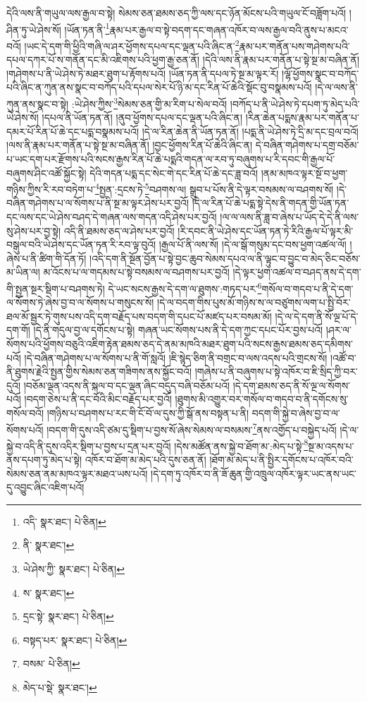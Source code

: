 དེའི་ལས་ནི་གཡུལ་ལས་རྒྱལ་བ་སྟེ། སེམས་ཅན་ཐམས་ཅད་ཀྱི་ལས་དང་ཉོན་མོངས་པའི་གཡུལ་ངོ་བཟློག་པའོ། །ཤིན་ཏུ་ཡེ་ཤེས་སོ། །ཡོན་ཏན་ནི་\footnote{འདི་  སྣར་ཐང་།  པེ་ཅིན། }རྣམ་པར་རྒྱལ་བ་སྟེ་བདག་དང་གཞན་འཁོར་བ་ལས་རྒྱལ་བའི་ནུས་པ་མངའ་བའོ། །ཡང་དེ་དག་གི་ཕྱིའི་གཞི་ལ་ཤར་ཕྱོགས་དཔལ་དང་ལྡན་པའི་ཞིང་ན་\footnote{ནི་  སྣར་ཐང་། }རྣམ་པར་གནོན་པས་གཤེགས་པའི་དཔལ་དཀར་པོ་ས་གནོན་དང་མི་འཇིགས་པའི་ཕྱག་རྒྱ་ཅན་ནོ། །དེའི་ལས་ནི་རྣམ་པར་གནོན་པ་སྟེ་སྔ་མ་བཞིན་ནོ། །གཤེགས་པ་ནི་ཡེ་ཤེས་ཏེ་མཐར་ཐུག་པ་རྟོགས་པའོ། །ཡོན་ཏན་ནི་དཔལ་ཏེ་སྔ་མ་ལྟར་རོ། །ལྷོ་ཕྱོགས་སྣང་བ་བཀོད་པའི་ཞིང་ན་ཀུན་ནས་སྣང་བ་བཀོད་པའི་དཔལ་སེར་པོ་ཉི་མ་དང་རིན་པོ་ཆེའི་སྡོང་བུ་བསྣམས་པའོ། །དེ་ལ་ལས་ནི་ཀུན་ནས་སྣང་བ་སྟེ། :ཡེ་ཤེས་ཀྱིས་\footnote{ཡེ་ཤེས་ཀྱི་  སྣར་ཐང་།  པེ་ཅིན། }སེམས་ཅན་གྱི་མ་རིག་པ་སེལ་བའོ། །བཀོད་པ་ནི་ཡེ་ཤེས་ཏེ་དཔག་ཏུ་མེད་པའི་ཡེ་ཤེས་སོ། །དཔལ་ནི་ཡོན་ཏན་ནོ། །ནུབ་ཕྱོགས་དཔལ་དང་ལྡན་པའི་ཞིང་ན། །རིན་ཆེན་པདྨས་རྣམ་པར་གནོན་པ་དམར་པོ་རིན་པོ་ཆེ་དང་པདྨ་བསྣམས་པའོ། །དེ་ལ་རིན་ཆེན་ནི་ཡོན་ཏན་ནོ། །པདྨ་ནི་ཡེ་ཤེས་ཏེ་དྲི་མ་དང་བྲལ་བའོ། །ལས་ནི་རྣམ་པར་གནོན་པ་སྟེ་སྔ་མ་བཞིན་ནོ། །བྱང་ཕྱོགས་རིན་པོ་ཆེའི་ཞིང་ན། དེ་བཞིན་གཤེགས་པ་དགྲ་བཅོམ་པ་ཡང་དག་པར་རྫོགས་པའི་སངས་རྒྱས་རིན་པོ་ཆེ་པདྨའི་གདན་ལ་རབ་ཏུ་བཞུགས་པ་རི་དབང་གི་རྒྱལ་པོ་བཞུགས་ཤིང་འཚོ་སྐྱོང་སྟེ། དེའི་གདན་པདྨ་དང་སེང་གེ་དང་རིན་པོ་ཆེ་དང་ཟླ་བའོ། །ནམ་མཁའ་ལྟར་སྔོ་བ་ཕྱག་གཉིས་ཀྱིས་རི་རབ་བཏེག་པ་\footnote{ས་  སྣར་ཐང་། }སྤྱན་:དྲངས་ཏེ་\footnote{དྲང་སྟེ་  སྣར་ཐང་།  པེ་ཅིན། }བཤགས་ལ། སྒྲུབ་པ་པོས་ནི་དེ་ལྟར་བསམས་ལ་བཤགས་སོ། །དེ་བཞིན་གཤེགས་པ་ལ་སོགས་པ་ནི་སྔ་མ་ལྟར་ཤེས་པར་བྱའོ། །དེ་ལ་རིན་པོ་ཆེ་པདྨ་སྟེ་དེས་ནི་གདན་གྱི་ཡོན་ཏན་དང་ལས་དང་ཡེ་ཤེས་བཤད་དེ་གཞན་ལས་གདན་འདི་ཤེས་པར་བྱའོ། །ལ་ལ་ལས་ནི་ཟླ་བ་ཞེས་པ་ཡོད་དེ་དེ་ནི་ལས་སུ་ཤེས་པར་བྱ་སྟེ། འདི་ནི་ཐམས་ཅད་ལ་ཤེས་པར་བྱའོ། །རི་དབང་ནི་ཡེ་ཤེས་དང་ཡོན་ཏན་ཏེ་རིའི་རྒྱལ་པོ་ལྟར་མི་བསྒུལ་བའི་ཡེ་ཤེས་དང་ཡོན་ཏན་རི་རབ་ལྟ་བུའོ། །རྒྱལ་པོ་ནི་ལས་སོ། །དེ་ལ་སྒོ་གསུམ་དང་བས་ཕྱག་འཚལ་ལོ། །ཞེས་པ་ནི་ཚིག་གི་དོན་ཏོ། །འདི་དག་ནི་སྔོན་བྱོན་པ་སྟེ་བྱང་ཆུབ་སེམས་དཔའ་ལ་ནི་ལྟུང་བ་བྱུང་བ་མེད་ཅིང་བཅོས་མ་ཡིན་ལ། མ་འོངས་པ་ལ་གདམས་པ་སྟེ་བསམས་ལ་བཤགས་པར་བྱའོ། །དེ་ལྟར་ཕྱག་འཚལ་བ་བཤད་ནས་དེ་དག་གི་སྤྱན་སྔར་སྡིག་པ་བཤགས་ཏེ། དེ་ཡང་སངས་རྒྱས་དེ་དག་ལ་ཐུགས་:གཏད་པར་\footnote{བསྟད་པར་  སྣར་ཐང་།  པེ་ཅིན། }གསོལ་བ་གདབ་པ་ནི་དེ་དག་ལ་སོགས་ཏེ་ཞེས་བྱ་བ་ལ་སོགས་པ་གསུངས་སོ། །དེ་ལ་བདག་གིས་པུས་མོ་གཉིས་ས་ལ་བཙུགས་ལག་པ་སྤྱི་བོར་ཐལ་མོ་སྦྱར་ཏེ་གུས་པས་འདི་དག་བརྗོད་པས་བདག་གི་དཔང་པོ་མཛད་པར་བསམ་མོ། །དེ་ལ་དེ་དག་ནི་སོ་ལྔ་པོ་དེ་དག་གོ། །དེ་ནི་གདུལ་བྱ་ལ་དགོངས་པ་སྟེ། གཞན་ཡང་སོགས་པས་ནི་དེ་དག་ཀྱང་དཔང་པོར་བྱས་པའོ། །ཤར་ལ་སོགས་པའི་ཕྱོགས་བཅུའི་འཇིག་རྟེན་ཐམས་ཅད་དེ་ནམ་མཁའི་མཐར་ཐུག་པའི་སངས་རྒྱས་ཐམས་ཅད་དམིགས་པའོ། །དེ་བཞིན་གཤེགས་པ་ལ་སོགས་པ་ནི་གོ་སླའོ། །ཇི་སྙེད་ཅིག་ནི་བགྲང་བ་ལས་འདས་པའི་གྲངས་སོ། །འཚོ་བ་ནི་ཐུགས་རྗེའི་སྤྱན་གྱིས་སེམས་ཅན་གཟིགས་ནས་སྐྱོང་བའོ། །གཞེས་པ་ནི་བཞུགས་པ་སྟེ་འཁོར་བ་ཇི་སྲིད་ཀྱི་བར་དུའོ། །བཅོམ་ལྡན་འདས་ནི་སྐལ་བ་དང་ལྡན་ཞིང་བདུད་བཞི་བཅོམ་པའོ། །དེ་དག་ཐམས་ཅད་ནི་སོ་ལྔ་ལ་སོགས་པའོ། །བདག་ཅེས་པ་ནི་དང་བོའི་མིང་བརྗོད་པར་བྱའོ། །ཐུགས་མི་འགྱུར་བར་གསོལ་བ་གདབ་བ་ནི་དགོངས་སུ་གསོལ་བའོ། །གཉིས་པ་བཤགས་པ་རང་གི་ངོ་བོ་ལ་དུས་ཀྱི་སྒོ་ནས་བསྟན་པ་ནི། བདག་གི་སྐྱེ་བ་ཞེས་བྱ་བ་ལ་སོགས་པའོ། །བདག་གི་དུས་འདི་ཙམ་དུ་སྡིག་པ་བྱས་སོ་ཞེས་སེམས་ལ་བསམས་\footnote{བསམ་  པེ་ཅིན། }ནས་འགྱོད་པ་བསྐྱེད་པའོ། །དེ་ལ་སྐྱེ་བ་འདི་ནི་དུས་འདིར་སྡིག་པ་བྱས་པ་དྲན་པར་བྱའོ། །དེས་མཚོན་ནས་སྐྱེ་བ་ཐོག་མ་:མེད་པ་སྟེ་\footnote{མེད་པ་སྡེ་  སྣར་ཐང་། }སྔ་མ་འདས་པ་ནས་དཔག་ཏུ་མེད་པ་སྟེ། འཁོར་བ་ཐོག་མ་མེད་པའི་དུས་ཅན་ནོ། །ཐོག་མ་མེད་པ་ནི་སྤྱིར་དགོངས་པ་འཁོར་བའི་སེམས་ཅན་ནམ་མཁའ་ལྟར་མཐའ་ཡས་པའོ། །དེ་དག་ཏུ་འཁོར་བ་ནི་ཟོ་ཆུན་གྱི་འཁྲུལ་འཁོར་ལྟར་ཡང་ནས་ཡང་དུ་འབྱུང་ཞིང་འཇིག་པའོ། 
